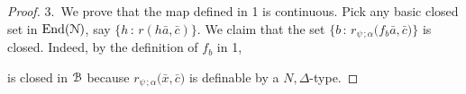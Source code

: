\begin{proof}

  3.\ 
  We prove that the map defined in 1 is continuous.
  Pick any basic closed set in ${\rm End}(\EuScript N)$, say $\big\{ h\, :\, r(h\bar a,\bar c)\big\}$.
  We claim that the set $\big\{b\, :\, r_{\psi\,;\alpha}(f_b\bar a,\bar c\big)\}$ is closed. Indeed, by the definition of $f_b$ in 1,


  is closed in $\EuScript B$ because $r_{\psi\,;\alpha}\big(\bar x,\bar c\big)$ is definable by a $N,\Delta$-type.
\end{proof}




% 





